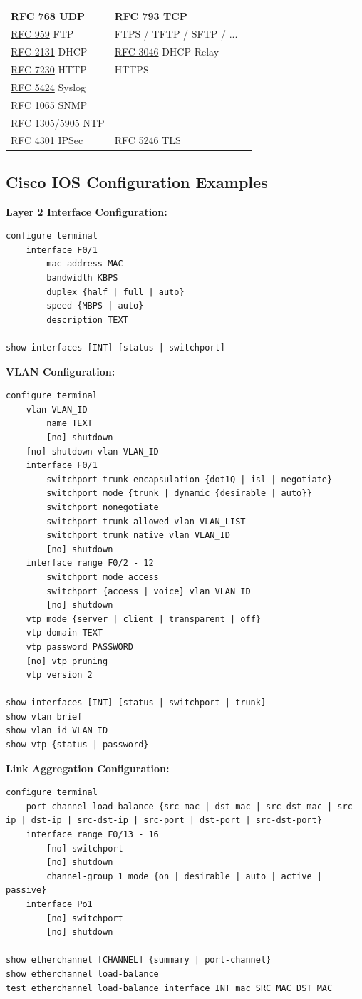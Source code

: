 \documentclass[12pt]{article}
\newcommand{\rfc}[1]{\href{https://datatracker.ietf.org/doc/html/rfc#1}{#1}}
\newcommand{\RFC}[1]{\href{https://datatracker.ietf.org/doc/html/rfc#1}{RFC #1}}
\begin{document}
\begin{table}[H]
\begin{tabular}{llr}
	\RFC{768} UDP				& \RFC{793} TCP			& \Cref{subsec:UDP,subsec:TCP}\\\hline
	\RFC{959} FTP				& FTPS / TFTP / SFTP / ...	& \Cref{subsec:FTP}\\
	\RFC{2131} DHCP				& \RFC{3046} DHCP Relay	& \Cref{subsec:DHCP}\\
	\RFC{7230} HTTP				& HTTPS				& \Cref{subsec:HTTP}\\
	\RFC{5424} Syslog				&					& \Cref{subsec:SYSLOG}\\
	\RFC{1065} SNMP				&					&\\
	RFC \rfc{1305}/\rfc{5905} NTP		&					&\\
	\RFC{4301} IPSec				& \RFC{5246} TLS			&\\\hline	
	\end{tabular}\end{table}


	\newpage
	\subsection{Cisco IOS Configuration Examples \label{subsec:CONFIG}}
	\textbf{Layer 2 Interface Configuration:}
	\begin{lstlisting}
configure terminal
	interface F0/1
		mac-address MAC
		bandwidth KBPS
		duplex {half | full | auto}
		speed {MBPS | auto}
		description TEXT

show interfaces [INT] [status | switchport]
	\end{lstlisting}

	\textbf{VLAN Configuration:}
	\begin{lstlisting}
configure terminal
	vlan VLAN_ID
		name TEXT
		[no] shutdown
	[no] shutdown vlan VLAN_ID
	interface F0/1
		switchport trunk encapsulation {dot1Q | isl | negotiate}
		switchport mode {trunk | dynamic {desirable | auto}}
		switchport nonegotiate
		switchport trunk allowed vlan VLAN_LIST
		switchport trunk native vlan VLAN_ID
		[no] shutdown
	interface range F0/2 - 12
		switchport mode access
		switchport {access | voice} vlan VLAN_ID
		[no] shutdown
	vtp mode {server | client | transparent | off}
	vtp domain TEXT
	vtp password PASSWORD
	[no] vtp pruning
	vtp version 2

show interfaces [INT] [status | switchport | trunk]
show vlan brief
show vlan id VLAN_ID
show vtp {status | password}
	\end{lstlisting}

	\textbf{Link Aggregation Configuration:}
	\begin{lstlisting}
configure terminal
	port-channel load-balance {src-mac | dst-mac | src-dst-mac | src-ip | dst-ip | src-dst-ip | src-port | dst-port | src-dst-port}
	interface range F0/13 - 16
		[no] switchport
		[no] shutdown
		channel-group 1 mode {on | desirable | auto | active | passive}
	interface Po1
		[no] switchport
		[no] shutdown

show etherchannel [CHANNEL] {summary | port-channel}
show etherchannel load-balance
test etherchannel load-balance interface INT mac SRC_MAC DST_MAC
	\end{lstlisting}
\end{document}
